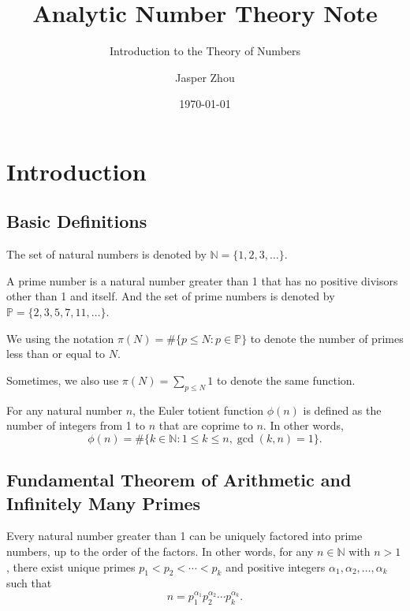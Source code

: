 \documentclass{elegantbook}
\title{Analytic Number Theory Note}
\subtitle{Introduction to the Theory of Numbers}
\author{Jasper Zhou}
\date{\today}
\begin{document}
\maketitle
\frontmatter

\tableofcontents

\mainmatter

\chapter{Introduction}

\section{Basic Definitions}

\begin{definition}
  The set of natural numbers is denoted by $\mathbb{N} = \{1, 2, 3, \ldots\}$.
\end{definition}

\begin{definition}
  A prime number is a natural number greater than 1 that has no positive divisors other than 1 and itself. And the set of prime numbers is denoted by $\mathbb{P} = \{2, 3, 5, 7, 11, \ldots\}$.
\end{definition}

\begin{definition}
  We using the notation $\pi(N)=\#\{p \leq N: p \in \mathbb{P}\}$ to denote the number of primes less than or equal to $N$.

  Sometimes, we also use $\pi(N)=\sum_{p \leq N} 1$ to denote the same function.
\end{definition}

\begin{definition}
  For any natural number $n$, the Euler totient function $\phi(n)$ is defined as the number of integers from 1 to $n$ that are coprime to $n$. In other words,
  \[
    \phi(n) = \#\{k \in \mathbb{N} : 1 \leq k \leq n, \gcd(k, n) = 1\}.
  \]
\end{definition}


\section{Fundamental Theorem of Arithmetic and Infinitely Many Primes}

\begin{theorem} \label{thm:FTA}
  Every natural number greater than 1 can be uniquely factored into prime numbers, up to the order of the factors.
  In other words, for any $n \in \mathbb{N}$ with $n > 1$, there exist unique primes $p_1 < p_2 < \cdots < p_k$ and positive integers $\alpha_1, \alpha_2, \ldots, \alpha_k$ such that
  \[
    n = p_1^{\alpha_1} p_2^{\alpha_2} \cdots p_k^{\alpha_k}.
  \]
\end{theorem}
\end{document}
